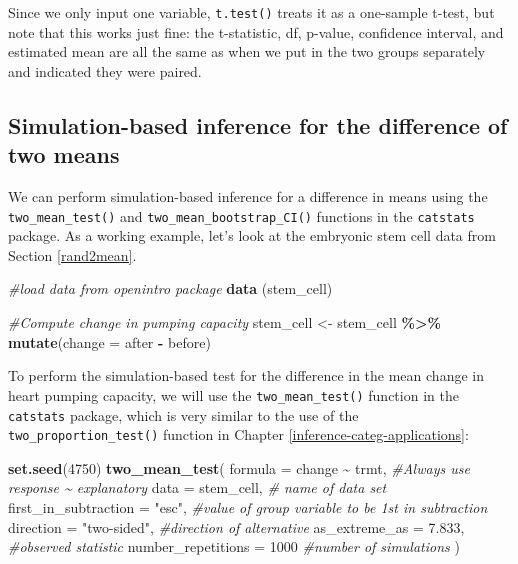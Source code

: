 \documentclass[
  10pt,
  openany]{book}
\newenvironment{Shaded}{\begin{snugshade}}{\end{snugshade}}
\newcommand{\AttributeTok}[1]{\textcolor[rgb]{0.13,0.29,0.53}{#1}}
\newcommand{\CommentTok}[1]{\textcolor[rgb]{0.56,0.35,0.01}{\textit{#1}}}
\newcommand{\DecValTok}[1]{\textcolor[rgb]{0.00,0.00,0.81}{#1}}
\newcommand{\FloatTok}[1]{\textcolor[rgb]{0.00,0.00,0.81}{#1}}
\newcommand{\FunctionTok}[1]{\textcolor[rgb]{0.13,0.29,0.53}{\textbf{#1}}}
\newcommand{\NormalTok}[1]{#1}
\newcommand{\OtherTok}[1]{\textcolor[rgb]{0.56,0.35,0.01}{#1}}
\newcommand{\SpecialCharTok}[1]{\textcolor[rgb]{0.81,0.36,0.00}{\textbf{#1}}}
\newcommand{\StringTok}[1]{\textcolor[rgb]{0.31,0.60,0.02}{#1}}
\theoremstyle{definition}
\theoremstyle{definition}
\theoremstyle{definition}
\theoremstyle{definition}
\theoremstyle{remark}
\begin{document}
Since we only input one variable, \texttt{t.test()} treats it as a one-sample t-test, but note that this works just fine: the t-statistic, df, p-value, confidence interval, and estimated mean are all the same as when we put in the two groups separately and indicated they were paired.

\subsection*{Simulation-based inference for the difference of two means}\label{simulation-based-inference-for-the-difference-of-two-means}

We can perform simulation-based inference for a difference in means using the \texttt{two\_mean\_test()} and \texttt{two\_mean\_bootstrap\_CI()} functions in the \texttt{catstats} package. As a working example, let's look at the embryonic stem cell data from Section \ref{rand2mean}.

\begin{Shaded}
\begin{Highlighting}[]
\CommentTok{\#load data from openintro package}
\FunctionTok{data}\NormalTok{ (stem\_cell)}

\CommentTok{\#Compute change in pumping capacity}
\NormalTok{stem\_cell }\OtherTok{\textless{}{-}}\NormalTok{ stem\_cell }\SpecialCharTok{\%\textgreater{}\%}
  \FunctionTok{mutate}\NormalTok{(}\AttributeTok{change =}\NormalTok{ after }\SpecialCharTok{{-}}\NormalTok{ before)}
\end{Highlighting}
\end{Shaded}

To perform the simulation-based test for the difference in the mean change in heart pumping capacity, we will use the \texttt{two\_mean\_test()} function in the \texttt{catstats} package, which is very similar to the use of the \texttt{two\_proportion\_test()} function in Chapter \ref{inference-categ-applications}:

\begin{Shaded}
\begin{Highlighting}[]
\FunctionTok{set.seed}\NormalTok{(}\DecValTok{4750}\NormalTok{)}
\FunctionTok{two\_mean\_test}\NormalTok{(}
  \AttributeTok{formula =}\NormalTok{ change }\SpecialCharTok{\textasciitilde{}}\NormalTok{ trmt,  }\CommentTok{\#Always use response \textasciitilde{} explanatory}
  \AttributeTok{data =}\NormalTok{ stem\_cell,  }\CommentTok{\# name of data set}
  \AttributeTok{first\_in\_subtraction =} \StringTok{"esc"}\NormalTok{,  }\CommentTok{\#value of group variable to be 1st in subtraction}
  \AttributeTok{direction =} \StringTok{"two{-}sided"}\NormalTok{,  }\CommentTok{\#direction of alternative}
  \AttributeTok{as\_extreme\_as =} \FloatTok{7.833}\NormalTok{,  }\CommentTok{\#observed statistic}
  \AttributeTok{number\_repetitions =} \DecValTok{1000}  \CommentTok{\#number of simulations}
\NormalTok{)}
\end{Highlighting}
\end{Shaded}
\end{document}
